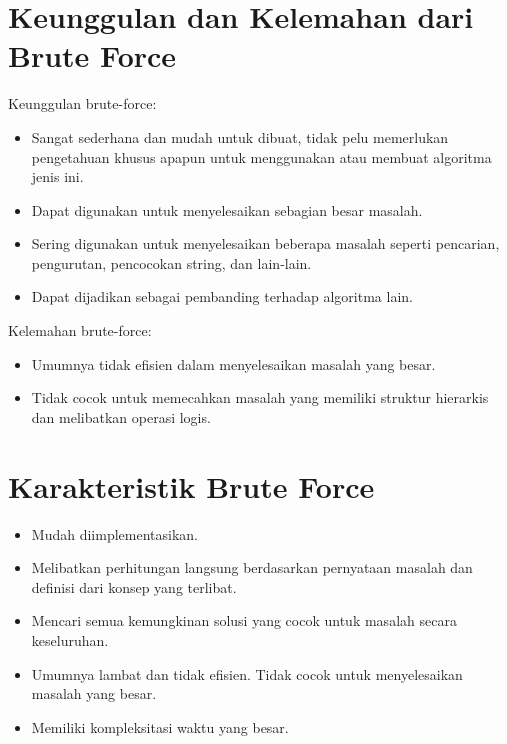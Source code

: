 \documentclass[12pt]{article}
\begin{document}
	\begin{figure}[htp]
		
	\end{figure}
	\begin{flushleft}
	\end{flushleft}
	\begin{flushleft}
	\end{flushleft}
	\begin{flushleft}
	\end{flushleft}

	\section*{Keunggulan dan Kelemahan dari Brute Force}
	\noindent Keunggulan brute-force:
	\begin{itemize}
		\item Sangat sederhana dan mudah untuk dibuat, tidak pelu memerlukan pengetahuan khusus
		apapun untuk menggunakan atau membuat algoritma jenis ini.
		\item Dapat digunakan untuk menyelesaikan sebagian besar masalah.
		\item Sering digunakan untuk menyelesaikan beberapa masalah seperti pencarian, pengurutan, pencocokan string, dan lain-lain.
		\item Dapat dijadikan sebagai pembanding terhadap algoritma lain.
	\end{itemize}
	Kelemahan brute-force:
	\begin{itemize}
		\item Umumnya tidak efisien dalam menyelesaikan masalah yang besar.
		\item Tidak cocok untuk memecahkan masalah yang memiliki struktur hierarkis dan melibatkan
		operasi logis.
	\end{itemize}
	
	\section*{Karakteristik Brute Force}
	\begin{itemize}
		\item Mudah diimplementasikan.
		\item Melibatkan perhitungan langsung berdasarkan pernyataan masalah dan definisi dari
		konsep yang terlibat.
		\item Mencari semua kemungkinan solusi yang cocok untuk masalah secara keseluruhan.
		\item Umumnya lambat dan tidak efisien. Tidak cocok untuk menyelesaikan masalah yang besar.
		\item Memiliki kompleksitasi waktu yang besar.
	\end{itemize}
\end{document}
